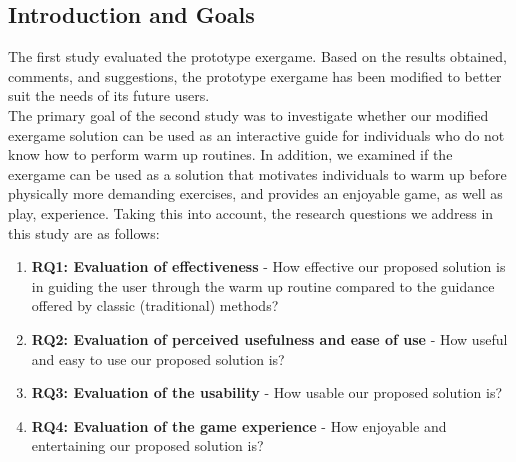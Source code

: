 \subsection{Introduction and Goals} \label{chapter:goals}
The first study evaluated the prototype exergame. Based on the results obtained, comments, and suggestions, the prototype exergame has been modified to better suit the needs of its future users.\\The primary goal of the second study was to investigate whether our modified exergame solution can be used as an interactive guide for individuals who do not know how to perform warm up routines. In addition, we examined if the exergame can be used as a solution that motivates individuals to warm up before physically more demanding exercises, and provides an enjoyable game, as well as play, experience. Taking this into account, the research questions we address in this study are as follows: 
\begin{enumerate}
\item \textbf{RQ1: Evaluation of effectiveness} - How effective our proposed solution is in guiding the user through the warm up routine compared to the guidance offered by classic (traditional) methods?
\item \textbf{RQ2: Evaluation of perceived usefulness and ease of use} - How useful and easy to use our proposed solution is?
\item \textbf{RQ3: Evaluation of the usability} - How usable our proposed solution is? 
\item \textbf{RQ4: Evaluation of the game experience} - How enjoyable and entertaining our proposed solution is? 
\end{enumerate}
